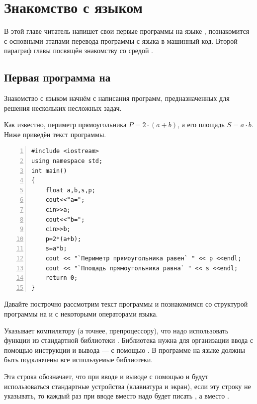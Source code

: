 \chapter[Знакомство с языком \Sys{С++}]{Знакомство с языком }

В этой главе читатель напишет свои первые программы на языке , 
познакомится с основными этапами перевода программы
с языка  в машинный код. Второй параграф главы посвящён 
знакомству со средой .

\section[Первая программа на \Sys{C++}]{Первая программа на }
Знакомство с языком  начнём с написания программ, предназначенных 
для решения нескольких несложных задач.


Как известно, периметр прямоугольника $P=2\cdot(a+b)$, а его площадь 
$S=a\cdot{b}$. 
Ниже приведён текст программы. 

\begin{lstlisting}[numbers=left, numberstyle=\tiny, stepnumber=1, numbersep=5pt]
#include <iostream> 
using namespace std; 
int main() 
{ 
    float a,b,s,p; 
    cout<<"a="; 
    cin>>a; 
    cout<<"b="; 
    cin>>b; 
    p=2*(a+b); 
    s=a*b; 
    cout << "`Периметр прямоугольника равен` " << p <<endl; 
    cout << "`Площадь прямоугольника равна` " << s <<endl; 
    return 0; 
}
\end{lstlisting}

Давайте построчно рассмотрим текст программы и познакомимся 
со структурой программы на  и с некоторыми операторами
языка. 

 Указывает компилятору (а точнее, препроцессору), что надо использовать функции из стандартной
библиотеки . Библиотека  нужна для организации ввода с
помощью инструкции  и вывода --- с помощью . В программе на языке  должны
быть подключены все используемые библиотеки.

 Эта строка обозначает, что при вводе и выводе с помощью  и
 будут использоваться стандартные устройства (клавиатура и экран), если эту строку не указывать,
то каждый раз при вводе вместо  надо будет писать , а вместо
.

